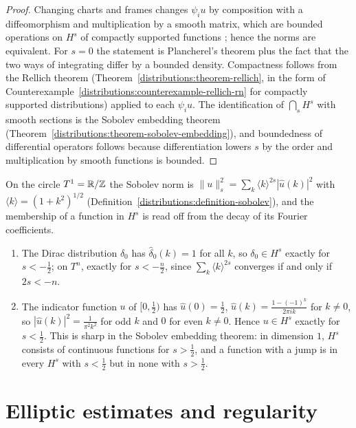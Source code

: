 \begin{proof}
Changing charts and frames changes $\psi_iu$ by composition with a diffeomorphism and multiplication by a smooth matrix, which are bounded operations on $H^s$ of compactly supported functions
\cite[Chapter 6]{warner-foundations}; hence the norms are equivalent. For $s = 0$ the statement is Plancherel's theorem plus the fact that the two ways of integrating differ by a bounded density. Compactness
follows from the Rellich theorem (Theorem~\ref{distributions:theorem-rellich}, in the form of Counterexample~\ref{distributions:counterexample-rellich-rn} for compactly supported distributions) applied to
each $\psi_iu$. The identification of $\bigcap_sH^s$ with smooth sections is the Sobolev embedding theorem (Theorem~\ref{distributions:theorem-sobolev-embedding}), and boundedness of differential operators
follows because differentiation lowers $s$ by the order and multiplication by smooth functions is bounded.
\end{proof}

\begin{example}\label{elliptic-operators:example-sobolev-circle}
On the circle $T^1 = \mathbb{R}/\mathbb{Z}$ the Sobolev norm is $\|u\|_s^2 = \sum_k\langle k\rangle^{2s}|\hat u(k)|^2$ with $\langle k\rangle = (1 + k^2)^{1/2}$ (Definition~\ref{distributions:definition-sobolev}), and the
membership of a function in $H^s$ is read off from the decay of its Fourier coefficients.
\begin{enumerate}
\item The Dirac distribution $\delta_0$ has $\hat\delta_0(k) = 1$ for all $k$, so $\delta_0 \in H^s$ exactly for $s < -\frac12$; on $T^n$, exactly for $s < -\frac n2$, since $\sum_k\langle k\rangle^{2s}$ converges
if and only if $2s < -n$.
\item The indicator function $u$ of $[0, \frac12)$ has $\hat u(0) = \frac12$, $\hat u(k) = \frac{1 - (-1)^k}{2\pi ik}$ for $k \neq 0$, so $|\hat u(k)|^2 = \frac{1}{\pi^2k^2}$ for odd $k$ and $0$ for even $k \neq 0$.
Hence $u \in H^s$ exactly for $s < \frac12$. This is sharp in the Sobolev embedding theorem: in dimension $1$, $H^s$ consists of continuous functions for $s > \frac12$, and a function with a jump is in
every $H^s$ with $s < \frac12$ but in none with $s > \frac12$.
\end{enumerate}
\end{example}

\section{Elliptic estimates and regularity}\label{elliptic-operators:section-estimates}

